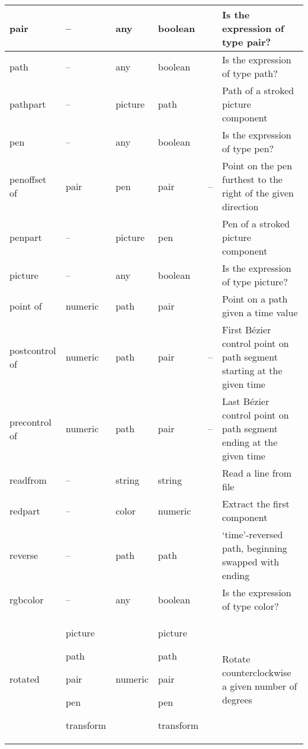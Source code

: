 \begin{longtable}{|>{\raggedright{}\ttfamily}p{.793in}*{3}{|>{\raggedright}p{.715in}}|>{\raggedleft}p{1.5em}|>{\raggedright\arraybackslash}X|}
pair&  --&  any&  boolean&  \pageref{Dpairop}&  Is the expression of type pair?\\\hline
path&  --&  any&  boolean&  \pageref{Dpathop}&  Is the expression of type path?\\\hline
pathpart&  --&  picture&  path&  \pageref{Dpathpart}&  Path of a stroked picture component\\\hline
pen&  --&  any&  boolean&  \pageref{Dpenop}&  Is the expression of type pen?\\\hline
penoffset of&  pair&  pen&  pair&  --&  Point on the pen furthest to the right of the given direction\\\hline
penpart&  --&  picture&  pen&  \pageref{Dpenpart}&  Pen of a stroked picture component\\\hline
picture&  --&  any&  boolean&  \pageref{Dpictop}&  Is the expression of type picture?\\\hline
point of&  numeric&  path&  pair&  \pageref{Dpntof}&  Point on a path given a time value\\\hline
postcontrol of&  numeric&  path&  pair&  --&  First B\'ezier control point on path segment starting at the given time\\\hline
precontrol of&  numeric&  path&  pair&  --&  Last B\'ezier control point on path segment ending at the given time\\\hline
readfrom&  --&  string&  string&  \pageref{Dreadfrom}&  Read a line from file\\\hline
redpart&  --&  color&  numeric&  \pageref{Drgbprt}&  Extract the first component\\\hline
reverse&  --&  path&  path&  \pageref{Drevrse}&  `time'-reversed path, beginning swapped with ending\\\hline
rgbcolor&  --&  any&  boolean&  \pageref{Drcolrop}&  Is the expression of type color?\\\hline
rotated&  picture\par path\par pair\par pen\par transform&  numeric&  picture\par path\par pair\par pen\par transform&  \pageref{Dtranop}&  Rotate counterclockwise a given number of degrees\\\hline

\end{longtable}

